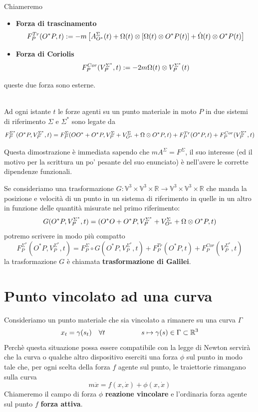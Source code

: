 \documentclass[11pt,a4paper,twoside]{book}
\newenvironment{proposizione}[1][\empty]{\begin{Proposizione}{
\ifx\empty#1\relax\else\mdseries\itshape#1\\\fi
}{}}{\end{Proposizione}}
\theoremstyle{esss}
\theoremstyle{dotless}
\numberwithin{equation}{section} %
\begin{document}
Chiameremo \begin{itemize}
\item \textbf{Forza di trascinamento}
\[
F_P^{Tr}(O^*P,t):=-m\left[ A_{O^*}^{\Sigma}(t)+ \Omega(t)\otimes \left[ \Omega(t) \otimes O^*P(t) \right] + \dot{\Omega}(t)\otimes O^*P(t) \right]
\]
\item \textbf{Forza di Coriolis} 
\[
F_P^{Cor}(V_P^{\Sigma^*},t):=-2m \Omega(t) \otimes V_P^{\Sigma^*}(t)
\]
\end{itemize}
queste due forza sono esterne.

\begin{proposizione}
Ad ogni istante $t$ le forze agenti su un punto materiale in moto $P$ in due sistemi di riferimento $\Sigma$ e $\Sigma^*$ sono legate da
\begin{align*}
F_P^{\Sigma^*}(O^*P,V_P^{\Sigma^*},t)= F_P^{\Sigma} (OO^*+O^*P, V_P^\Sigma+V_{O^*}^{\Sigma}+\Omega\otimes O^*P, t) + F_P^{Tr}(O^*P,t) + F_P^{Cor}(V_P^{\Sigma^*},t)
\end{align*}
\end{proposizione}

Questa dimostrazione è immediata sapendo che $mA^\Sigma=F^\Sigma$, il suo interesse (ed il motivo per la scrittura un po' pesante del suo enunciato) è nell'avere le corrette dipendenze funzionali.

Se consideriamo una trasformazione $G:\mathbb{V}^3\times\mathbb{V}^3\times\mathbb{R}\rightarrow\mathbb{V}^3\times\mathbb{V}^3\times\mathbb{R}$ che manda la posizione e velocità di un punto in un sistema di riferimento in quelle in un altro in funzione delle quantità misurate nel primo riferimento:
\begin{equation}
G(O^*P,V_P^{\Sigma^*},t)=(O^*O+O^*P, V_P^{\Sigma^*}+V_{O^*}^\Sigma+\Omega\otimes O^*P, t)
\end{equation}
potremo scrivere in modo più compatto
\[
F_P^{\Sigma^*}(O^*P,V_P^{\Sigma^*},t)=F_P^\Sigma \circ G (O^*P,V_P^{\Sigma^*},t) + F_P^{Tr}(O^*P,t) + F_P^{Cor} (V_P^{\Sigma^*},t)
\]
la trasformazione $G$ è chiamata \textbf{trasformazione di Galilei}.




\section{Punto vincolato ad una curva}
Consideriamo un punto materiale che sia vincolato a rimanere su una curva $\Gamma$
\[
x_t=\gamma(s_t) \quad \forall t \hspace{0.15\linewidth} s\mapsto\gamma(s)\in\Gamma\subset\mathbb{R}^3
\]
Perchè questa situazione possa essere compatibile con la legge di Newton servirà che la curva o qualche altro dispositivo eserciti una forza $\phi$ sul punto in modo tale che, per ogni scelta della forza $f$ agente sul punto, le traiettorie rimangano sulla curva
\[
m\ddot{x}=f(x,\dot{x})+\phi(x,\dot{x})
\] 
Chiameremo il campo di forza $\phi$ \textbf{reazione vincolare} e l'ordinaria forza agente sul punto $f$ \textbf{forza attiva}.
\end{document}
